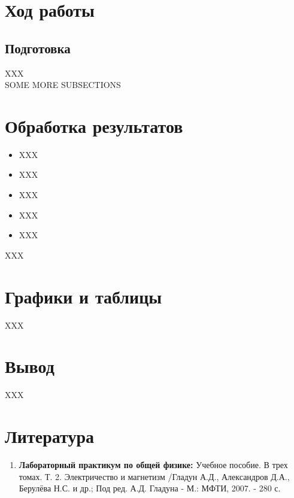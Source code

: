 \documentclass[a4paper, 12pt]{article}%
\begin{document}
\section{Ход работы}

\subsection{Подготовка}


XXX\\
SOME MORE SUBSECTIONS

\section{Обработка результатов}

\begin{itemize}

\item XXX

\item XXX

\item XXX

\item XXX

\item XXX

\end{itemize}

XXX

\section{Графики и таблицы}

XXX

\section{Вывод}

XXX

\section{Литература}

\begin{enumerate}
\item \textbf{Лабораторный практикум по общей физике:} Учебное пособие. В трех томах. Т. 2. Электричество и магнетизм /Гладун А.Д., Александров Д.А., Берулёва Н.С. и др.; Под ред. А.Д. Гладуна - М.: МФТИ, 2007. - 280 с.
\end{enumerate}		
		
					
\end{document}
